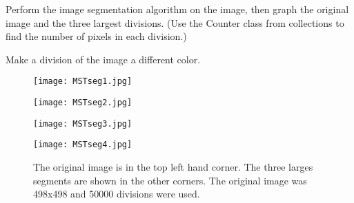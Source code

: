 \begin{problem}
Perform the image segmentation algorithm on the image, then graph the original image and the three largest divisions.
(Use the Counter class from collections to find the number of pixels in each division.)
\end{problem}

\begin{problem}
Make a division of the image a different color.
\end{problem}


\vfill
\begin{figure}[ht]
\begin{minipage}[b]{0.47\linewidth}
\centering
\texttt{[image: MSTseg1.jpg]}
\end{minipage}
\hspace{0.5cm}
\begin{minipage}[b]{0.47\linewidth}
\centering
\texttt{[image: MSTseg2.jpg]}
\end{minipage}
\begin{minipage}[b]{0.47\linewidth}
\centering
\texttt{[image: MSTseg3.jpg]}
\end{minipage}
\hspace{0.5cm}
\begin{minipage}[b]{0.47\linewidth}
\centering
\texttt{[image: MSTseg4.jpg]}
\end{minipage}
\caption{The original image is in the top left hand corner. The three larges segments are shown in the other corners. The original image was 498x498 and 50000 divisions were used.}
\label{mst:graph6}
\end{figure}
\vfill 
